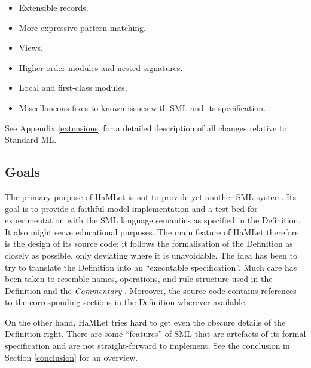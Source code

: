 \documentclass[twoside,titlepage]{article}
\newcommand{\void}[1]{}
\begin{document}
\begin{itemize}\setlength{\itemsep}{0em}
\item Extensible records.
\item More expressive pattern matching.
\item Views.
\item Higher-order modules and nested signatures.
\item Local and first-class modules.
\item Miscellaneous fixes to known issues with SML and its specification.
\end{itemize}

See Appendix \ref{extensions} for a detailed description of all changes relative to Standard ML.
\void{
In the future, I would very much like to incorporate the following:

\begin{itemize}\setlength{\itemsep}{0em}
\item Higher-order and first-class polymorphism.
\item Type classes.
\item More expressive signature composition.
\end{itemize}
}


\subsection{Goals}
\label{goals}

The primary purpose of HaMLet is not to provide yet another SML system. Its goal is to provide a faithful model implementation and a test bed for experimentation with the SML language semantics as specified in the Definition. It also might serve educational purposes. The main feature of HaMLet therefore is the design of its source code: it follows the formalisation of the Definition as closely as possible, only deviating where it is unavoidable. The idea has been to try to translate the Definition into an ``executable specification''. Much care has been taken to resemble names, operations, and rule structure used in the Definition and the {\em Commentary} \cite{commentary}. Moreover, the source code contains references to the corresponding sections in the Definition wherever available.

On the other hand, HaMLet tries hard to get even the obscure details of the Definition right. There are some ``features'' of SML that are artefacts of its formal specification and are not straight-forward to implement. See the conclusion in Section \ref{conclusion} for an overview.
\end{document}
